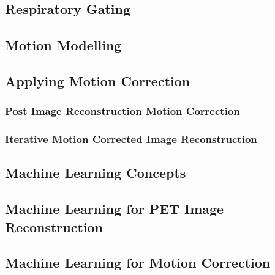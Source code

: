                 
        \subsection{Respiratory Gating} \label{sec:respiratory_gating}
            
            
        \subsection{Motion Modelling} \label{sec:motion_modelling}
            
        
        \subsection{Applying Motion Correction} \label{sec:applying_motion_correction}
            
            
            \subsubsection{Post Image Reconstruction Motion Correction} \label{sec:post_image_reconstruction_motion_correction}
                
                
            \subsubsection{Iterative Motion Corrected Image Reconstruction} \label{sec:iterative_motion_corrected_image_reconstruction}
                
    
        
        
        \subsection{Machine Learning Concepts} \label{sec:machine_learning_concepts}
            
        
        \subsection{Machine Learning for PET Image Reconstruction} \label{sec:machine_learning_for_pet_image_reconstruction}
            
        
        \subsection{Machine Learning for Motion Correction} \label{sec:machine_learning_for_motion_correction}
            
